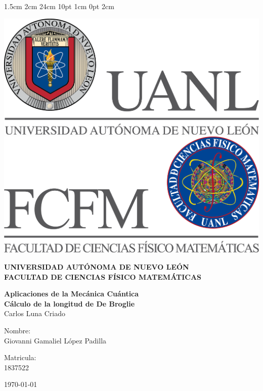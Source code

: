 \documentclass[12pt,letterpaper]{report}
\begin{document}
\setmargins{2.5cm}      
{1.5cm}                     
{2cm}  
{24cm}                    
{10pt}                          
{1cm}                          
{0pt}                             
{2cm}
\begin{titlepage}
\begin{center}
\includegraphics[scale=0.40]{../../Logos/uanl.png} 
\hspace{2.5cm}
\includegraphics[scale=0.40]{../../Logos/fcfm.png}
\end{center}
\vspace{2cm}
\begin{center}
\textbf{
UNIVERSIDAD AUTÓNOMA DE NUEVO LEÓN\\
FACULTAD DE CIENCIAS
    FÍSICO MATEMÁTICAS}\\
\vspace*{2cm}
\begin{large}
\vspace{1cm}
\large{\textbf{Aplicaciones de la Mecánica Cuántica}}\\
\textbf{Cálculo de la longitud de De Broglie}\\
Carlos Luna Criado\\
\end{large}
\vspace{3.5cm}
\begin{minipage}{0.6\linewidth}
\vspace{0.5cm}
\changefontsizes{14pt}
Nombre:\\
Giovanni Gamaliel López Padilla\\
\end{minipage}
\begin{minipage}{0.2\linewidth}
\changefontsizes{14pt}
Matricula:\\
1837522
\end{minipage}
\end{center}
\vspace{4cm}
\begin{flushright}
\today
\end{flushright}
\end{titlepage}
\end{document}
